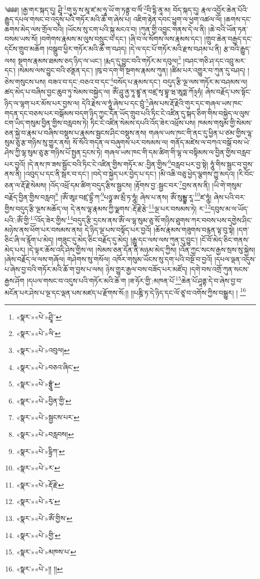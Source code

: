 ༄༅༅། །རྒྱ་གར་སྐད་དུ། ཤྲཱི་\footnote{«སྣར་»«པེ་»ཤྲཱི་་}གུ་ཧྱ་ས་མཱ་ཛ་མ་ཧཱ་ཡོ་ག་ཏནྟྲ་བ་ལིཾ་\footnote{«སྣར་»«པེ་»ལི་}བི་དྷི་ནཱ་མ། བོད་སྐད་དུ། རྣལ་འབྱོར་ཆེན་པོའི་རྒྱུད་དཔལ་གསང་བ་འདུས་པའི་གཏོར་མའི་ཆོ་ག་ཞེས་པ། འཇིག་རྟེན་དབང་ཕྱུག་ལ་ཕྱག་འཚལ་ལོ། །ཆགས་དང་ཆགས་མེད་ལས་གྲོལ་བའི། །ཡོངས་སུ་ངག་པའི་སྐུ་མངའ་བ། །ཀུན་གྱི་འབྱུང་གནས་དེ་ལ་ནི། །ཆེ་བའི་ཡོན་ཏན་བསམ་ཡས་སོ། །བགེགས་རྣམས་མ་ལུས་བསྲུང་བ་དང་། །ཞི་བ་ལ་སོགས་ལས་རྣམས་དང་། །གྲུབ་ཆེན་བརྒྱད་དང་དངོས་གྲུབ་མཆོག །བསྒྲུབ་ཕྱིར་གཏོར་མའི་ཆོ་ག་བཤད། །དེ་ལ་དང་པོ་གཏོར་མའི་རྫས་བཤམ་པ་ནི། རྩ་བའི་རྒྱུད་ལས། སྔགས་རྣམས་ཐམས་ཅད་ཉིད་ལ་ཡང་། །རྨད་དུ་བྱུང་བའི་གཏོར་མ་དབུལ།\footnote{«སྣར་»«པེ་»འབུལ།} །བཤང་གཅི་ཤ་དང་འབྲུ་མར་དང་། །སེམས་ལས་བྱུང་བའི་ཙནྡན་དང་། །ཁུ་བ་དག་གི་སྔགས་རྣམས་ཀུན། །ཚིམ་པར་འགྱུར་བ་ཀུན་དུ་བཤད། །ཅེས་གསུངས་པས། བཟའ་བ་དང་:བཅའ་བ་དང་\footnote{«སྣར་»«པེ་»བཅའ་ཞིང་}བསོད་པ་རྣམས་དང་། བདུད་རྩི་ལྔ་ལས་གཏོར་མ་བཤམས་ལ། ཚད་མེད་པ་བཞིས་བྱང་ཆུབ་ཏུ་སེམས་བསྐྱེད་ལ། ཨོཾ་ཤཱུ་ནྱ་ཏཱ་ཛྙཱ་ན་བཛྲ་སྭ་བྷཱ་ཝ་ཨཱཏྨ་ཀོ྅ཧཾ། ཞེས་བརྗོད་པས་སྟོང་ཉིད་ལ་ལྷག་པར་མོས་པར་བྱས་ལ། དེའི་རྗེས་ལ་ཧཱུཾ་ཞེས་པ་དང་བྲུཾ་\footnote{«སྣར་»«པེ་»བྷྲཱུཾ་}ཞེས་པས་རྡོ་རྗེའི་གུར་དང་གཞལ་ཡས་ཁང་གདན་དང་བཅས་པར་བསྒོམས་བདག་ཉིད་ཀྱང་དོན་ཡོད་གྲུབ་པའི་ཏིང་ངེ་འཛིན་དུ་སྐད་ཅིག་གིས་བསྐྱེད་ལ་ལུས་ངག་ཡིད་གསུམ་བྱིན་གྱིས་བརླབས་ཏེ། ཏིང་ངེ་འཛིན་སེམས་དཔའི་འོད་ཟེར་འཕྲོས་པས། ཁམས་གསུམ་གྱི་སེམས་ཅན་སྐྱེ་བ་རྣམ་པ་བཞིས་བསྡུས་པ་རྣམས་སྦྱངས་ཤིང་བསྡུས་ནས། གཞལ་ཡས་ཁང་གི་ནང་དུ་ཕྱིན་པ་ཙམ་གྱིས་ལྷ་སུམ་ཅུ་རྩ་གཉིས་སུ་གྱུར་ནས། སོ་སོའི་གདན་ལ་བཞུགས་པར་བསམས་ལ། གནོད་མཛེས་ལ་བཀའ་བསྒོ་བས་ཡེ་ཤེས་ཀྱི་ལྷ་སུམ་ཅུ་རྩ་གཉིས་པོ་སྤྱན་དྲངས་ཏེ། གཞལ་ཡས་ཁང་གི་དམ་ཚིག་གི་ལྷ་ལ་བསྟིམས་ལ་བྱིན་གྱིས་བརླབ་པར་བྱའོ། །དེ་ནས་ཁ་ཟས་སྦྱོང་བའི་ཏིང་ངེ་འཛིན་གྱིས་གཏོར་མ་:བྱིན་གྱིས་\footnote{«སྣར་»«པེ་»བྱིན་གྱི་}བརླབ་པར་བྱ་སྟེ། ཧཱུཾ་གིས་སྦྱང་བ་བྱས་ནས་ནི། །འབུད་པ་དང་ནི་སྦར་བ་དང་། །བདེ་བ་སྐྱེད་པར་བྱེད་པ་དང་། །མི་འཆི་བཅུ་ཕྱེད་ལྕགས་ཀྱུ་མདའ། །རི་བོང་ཅན་ལ་རྡོ་རྗེ་སེམས། །འོད་འཕྲོ་དམ་ཚིག་བདུད་རྩིས་སྦྱངས། །རྟོགས་བྱ་:སྦྱང་བར་\footnote{«སྣར་»«པེ་»སྦྱངས་པར་}བྱས་ནས་ནི། །ཡི་གེ་གསུམ་བརྗོད་བྱིན་གྱིས་བརླབ།\footnote{«སྣར་»«པེ་»བརླབས།} །ཨོཾ་ཨཱཿ་བཛྲ་དྷྲྀ་ཀ་\footnote{«སྣར་»«པེ་»དྷྲིཀ་}པཉྩ་ཨ་མྲྀ་ཏ་ཧཱུཾ། ཞེས་པ་ནས། ཨོཾ་སུམྦྷ་རཱ་\footnote{«སྣར་»«པེ་»ར་}ཛ་ཧཱུཾ། ཞེས་པའི་བར་གྱིས་བདུད་རྩི་ལྔས་མཆོད་ལ། དེ་ནས་ལྷ་རྣམས་ཀྱི་ལྗགས་:རྡོ་རྗེ་རྩེ་\footnote{«སྣར་»«པེ་»རྡོ་རྗེ་}ལྔ་པར་བསམས་ཏེ། ར་\footnote{«སྣར་»«པེ་»རྭ་}དབུས་མ་ལ་ཡོད་པའི་:ཨོཾ་གྱི་\footnote{«སྣར་»«པེ་»ཨོཾ་གྱིས་}འོད་ཟེར་གྱིས་\footnote{«སྣར་»«པེ་»གྱི་}བདུད་རྩི་དྲངས་ནས་ཨོཾ་ལ་ལྷ་སུམ་ཅུ་སོ་གཉིས་ཐུགས་ཀར་བབས་པས་དགྱེས་ཤིང་མཉེས་ནས་ཕོག་པར་བསམས་ནས། དེ་ཉིད་ལྔ་པས་བསྟོད་པར་བྱའོ། །ཆོས་རྣམས་གཟུགས་བརྙན་ལྟ་བུ་སྟེ། །དག་ཅིང་ཞི་ལ་རྙོག་པ་མེད། །གཟུང་དུ་མེད་ཅིང་བརྗོད་དུ་མེད། །རྒྱུ་དང་ལས་ལས་ཀུན་དུ་བྱུང་། །ངོ་བོ་མེད་ཅིང་གནས་མེད་པར། །དེ་ལྟར་ཆོས་འདི་ཤེས་གྱིས་ལ། །སེམས་ཅན་དོན་ནི་མཉམ་མེད་ཀྱིས། །འོན་ཀྱང་སངས་རྒྱས་སྲས་སུ་སྐྱེས། །ཞེས་བརྗོད་ལ་ལས་གཞོལ། གཤེགས་སུ་གསོལ། འཁོར་གསུམ་ཡོངས་སུ་དག་པའི་བསྔོ་བ་བྱའོ། །དཔལ་ལྡན་འདུས་པ་ཞེས་བྱ་བའི་གཏོར་མའི་ཆོ་ག་བྱས་པ་ལས། ཉེས་གྱུར་རྒྱལ་བས་བཟོད་པར་མཛོད། །དགེ་བས་འགྲོ་ཀུན་སངས་རྒྱས་ཤོག །དཔལ་གསང་བ་འདུས་པའི་གཏོར་མའི་ཆོ་ག །ཟ་ཧོར་གྱི་:མཁན་པོ་\footnote{«སྣར་»«པེ་»མཁས་པ་}ཆེན་པོ་ཤཱནྟ་དེ་བ་ཞེས་བྱ་བ་མངོན་པར་ཤེས་པ་ལྔ་དང་ལྡན་པས་མཛད་པ་རྫོགས་སོ:།། །།པཎྜི་ཏ་དེ་ཉིད་དང་ལོ་ཙཱ་བ་འགོས་ཀྱིས་བསྒྱུར། ། \footnote{«སྣར་»«པེ་»།། །། }
